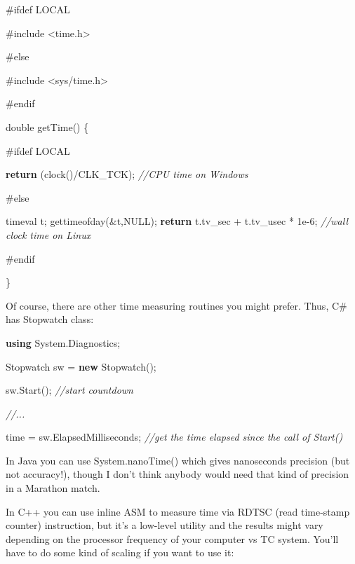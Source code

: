 \documentclass[]{article}
\newenvironment{Shaded}{}{}
\newcommand{\CommentTok}[1]{\textcolor[rgb]{0.38,0.63,0.69}{\textit{#1}}}
\newcommand{\ControlFlowTok}[1]{\textcolor[rgb]{0.00,0.44,0.13}{\textbf{#1}}}
\newcommand{\DataTypeTok}[1]{\textcolor[rgb]{0.56,0.13,0.00}{#1}}
\newcommand{\FloatTok}[1]{\textcolor[rgb]{0.25,0.63,0.44}{#1}}
\newcommand{\FunctionTok}[1]{\textcolor[rgb]{0.02,0.16,0.49}{#1}}
\newcommand{\ImportTok}[1]{#1}
\newcommand{\KeywordTok}[1]{\textcolor[rgb]{0.00,0.44,0.13}{\textbf{#1}}}
\newcommand{\NormalTok}[1]{#1}
\newcommand{\PreprocessorTok}[1]{\textcolor[rgb]{0.74,0.48,0.00}{#1}}
\begin{document}
\begin{Shaded}
\begin{Highlighting}[]
\PreprocessorTok{#ifdef LOCAL}

\PreprocessorTok{#include }\ImportTok{<time.h>}

\PreprocessorTok{#else}

\PreprocessorTok{#include }\ImportTok{<sys/time.h>}

\PreprocessorTok{#endif}
 

\DataTypeTok{double}\NormalTok{ getTime() \{}

\PreprocessorTok{#ifdef LOCAL}

   \ControlFlowTok{return}\NormalTok{ (clock()/CLK_TCK);            }\CommentTok{//CPU time on Windows}

\PreprocessorTok{#else}

\NormalTok{   timeval t;}
\NormalTok{   gettimeofday(&t,NULL);}
   \ControlFlowTok{return}\NormalTok{ t.tv_sec + t.tv_usec * }\FloatTok{1e-6}\NormalTok{;  }\CommentTok{//wall clock time on Linux}

\PreprocessorTok{#endif}

\NormalTok{\}}
\end{Highlighting}
\end{Shaded}

Of course, there are other time measuring routines you might prefer.
Thus, C\# has Stopwatch class:

\begin{Shaded}
\begin{Highlighting}[]
\KeywordTok{using}\NormalTok{ System.}\FunctionTok{Diagnostics}\NormalTok{;}

\NormalTok{Stopwatch sw = }\KeywordTok{new} \FunctionTok{Stopwatch}\NormalTok{();}

\NormalTok{sw.}\FunctionTok{Start}\NormalTok{();                 }\CommentTok{//start countdown}

\CommentTok{//...}

\NormalTok{time = sw.}\FunctionTok{ElapsedMilliseconds}\NormalTok{;  }\CommentTok{//get the time elapsed since the call of Start()}
\end{Highlighting}
\end{Shaded}

In Java you can use System.nanoTime() which gives nanoseconds precision
(but not accuracy!), though I don't think anybody would need that kind
of precision in a Marathon match.

In C++ you can use inline ASM to measure time via RDTSC (read time-stamp
counter) instruction, but it's a low-level utility and the results might
vary depending on the processor frequency of your computer vs TC system.
You'll have to do some kind of scaling if you want to use it:
\end{document}
